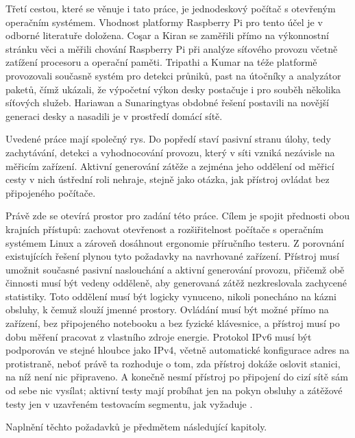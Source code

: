 Třetí cestou, které se věnuje i tato práce, je jednodeskový počítač s otevřeným operačním systémem. Vhodnost platformy Raspberry Pi pro tento účel je v odborné literatuře doložena. Coşar a Kiran \cite{cosar2018} se zaměřili přímo na výkonnostní stránku věci a měřili chování Raspberry Pi při analýze síťového provozu včetně zatížení procesoru a operační paměti. Tripathi a Kumar \cite{tripathi2018} na téže platformě provozovali současně systém pro detekci průniků, past na útočníky a analyzátor paketů, čímž ukázali, že výpočetní výkon desky postačuje i pro souběh několika síťových služeb. Hariawan a Sunaringtyas \cite{hariawan2021} obdobné řešení postavili na novější generaci desky a nasadili je v prostředí domácí sítě.

Uvedené práce mají společný rys. Do popředí staví pasivní stranu úlohy, tedy zachytávání, detekci a vyhodnocování provozu, který v síti vzniká nezávisle na měřicím zařízení. Aktivní generování zátěže a zejména jeho oddělení od měřicí cesty v nich ústřední roli nehraje, stejně jako otázka, jak přístroj ovládat bez připojeného počítače.

Právě zde se otevírá prostor pro zadání této práce. Cílem je spojit přednosti obou krajních přístupů: zachovat otevřenost a rozšiřitelnost počítače s operačním systémem Linux a zároveň dosáhnout ergonomie příručního testeru. Z porovnání existujících řešení plynou tyto požadavky na navrhované zařízení. Přístroj musí umožnit současné pasivní naslouchání a aktivní generování provozu, přičemž obě činnosti musí být vedeny odděleně, aby generovaná zátěž nezkreslovala zachycené statistiky. Toto oddělení musí být logicky vynuceno, nikoli ponecháno na kázni obsluhy, k čemuž slouží jmenné prostory. Ovládání musí být možné přímo na zařízení, bez připojeného notebooku a bez fyzické klávesnice, a přístroj musí po dobu měření pracovat z vlastního zdroje energie. Protokol IPv6 musí být podporován ve stejné hloubce jako IPv4, včetně automatické konfigurace adres na protistraně, neboť právě ta rozhoduje o tom, zda přístroj dokáže oslovit stanici, na níž není nic připraveno. A konečně nesmí přístroj po připojení do cizí sítě sám od sebe nic vysílat; aktivní testy mají probíhat jen na pokyn obsluhy a zátěžové testy jen v uzavřeném testovacím segmentu, jak vyžaduje \cite{rfc6815}.

Naplnění těchto požadavků je předmětem následující kapitoly.